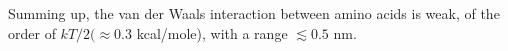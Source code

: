 \begin{subappendices}
 Summing up, the van der Waals interaction between amino acids is weak, of the order of $kT/2(\approx0.3 $ kcal/mole), with a range $\lesssim0.5$ nm.


\end{subappendices}
